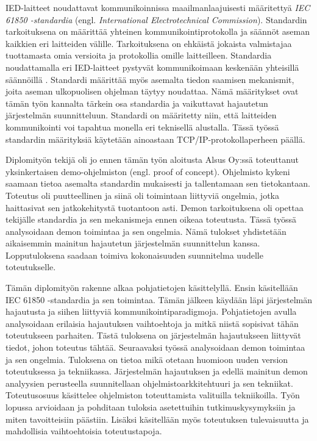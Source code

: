 IED-laitteet noudattavat kommunikoinnissa maailmanlaajuisesti määritettyä \emph{IEC 61850 -standardia} (engl. \emph{International Electrotechnical Commission}). Standardin tarkoituksena on määrittää yhteinen kommunikointiprotokolla ja säännöt aseman kaikkien eri laitteiden välille. Tarkoituksena on ehkäistä jokaista valmistajaa tuottamasta omia versioita ja protokollia omille laitteilleen. Standardia noudattamalla eri IED-laitteet pystyvät kommunikoimaan keskenään yhteisillä säännöillä \cite[s.~624]{Mackiewicz2006}. Standardi määrittää myös asemalta tiedon saamisen mekanismit, joita aseman ulkopuolisen ohjelman täytyy noudattaa. Nämä määritykset ovat tämän työn kannalta tärkein osa standardia ja vaikuttavat hajautetun järjestelmän suunnitteluun. Standardi on määritetty niin, että laitteiden kommunikointi voi tapahtua monella eri teknisellä alustalla. Tässä työssä standardin määrityksiä käytetään ainoastaan TCP/IP-protokollaperheen päällä.

Diplomityön tekijä oli jo ennen tämän työn aloitusta Alsus Oy:ssä toteuttanut yksinkertaisen demo-ohjelmiston (engl. proof of concept). Ohjelmisto kykeni saamaan tietoa asemalta standardin mukaisesti ja tallentamaan sen tietokantaan. Toteutus oli puutteellinen ja siinä oli toimintaan liittyviä ongelmia, jotka haittasivat sen jatkokehitystä tuotantoon asti. Demon tarkoituksena oli opettaa tekijälle standardia ja sen mekanismeja ennen oikeaa toteutusta. Tässä työssä analysoidaan demon toimintaa ja sen ongelmia. Nämä tulokset yhdistetään aikaisemmin mainitun hajautetun järjestelmän suunnittelun kanssa. Lopputuloksena saadaan toimiva kokonaisuuden suunnitelma uudelle toteutukselle.

Tämän diplomityön rakenne alkaa pohjatietojen käsittelyllä. Ensin käsitellään IEC 61850 -standardia ja sen toimintaa. Tämän jälkeen käydään läpi järjestelmän hajautusta ja siihen liittyviä kommunikointiparadigmoja. Pohjatietojen avulla analysoidaan erilaisia hajautuksen vaihtoehtoja ja mitkä niistä sopisivat tähän toteutukseen parhaiten. Tästä tuloksena on järjestelmän hajautukseen liittyvät tiedot, johon toteutus tähtää. Seuraavaksi työssä analysoidaan demon toimintaa ja sen ongelmia. Tuloksena on tietoa mikä otetaan huomioon uuden version toteutuksessa ja tekniikassa. Järjestelmän hajautuksen ja edellä mainitun demon analyysien perusteella suunnitellaan ohjelmistoarkkitehtuuri ja sen tekniikat. Toteutusosuus käsittelee ohjelmiston toteuttamista valituilla tekniikoilla. Työn lopussa arvioidaan ja pohditaan tuloksia asetettuihin tutkimuskysymyksiin ja miten tavoitteisiin päästiin. Lisäksi käsitellään myös toteutuksen tulevaisuutta ja mahdollisia vaihtoehtoisia toteutustapoja.


